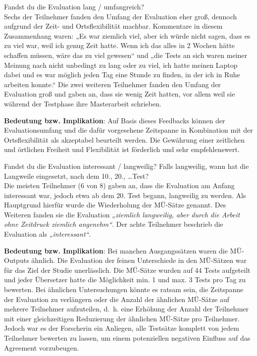 



\begin{description}[font = \normalfont]
\item [1.] Fandst du die Evaluation lang / umfangreich?\\
Sechs der Teilnehmer fanden den Umfang der Evaluation eher groß, dennoch aufgrund der Zeit- und Ortsflexibilität machbar. Kommentare in diesem Zusammenhang waren: „Es war ziemlich viel, aber ich würde nicht sagen, dass es zu viel war, weil ich genug Zeit hatte. Wenn ich das alles in 2 Wochen hätte schaffen müssen, wäre das zu viel gewesen“ und „die Tests an sich waren meiner Meinung nach nicht unbedingt zu lang oder zu viel, ich hatte meinen Laptop dabei und es war möglich jeden Tag eine Stunde zu finden, in der ich in Ruhe arbeiten konnte.“ Die zwei weiteren Teilnehmer fanden den Umfang der Evaluation groß und gaben an, dass sie wenig Zeit hatten, vor allem weil sie während der Testphase ihre Masterarbeit schrieben.

\textbf{Bedeutung bzw. Implikation}: Auf Basis dieses Feedbacks können der Evaluationsumfang und die dafür vorgesehene Zeitspanne in Kombination mit der Ortsflexibilität als akzeptabel beurteilt werden. Die Gewährung einer zeitlichen und örtlichen Freiheit und Flexibilität ist förderlich und sehr empfehlenswert.

\item[2.] Fandst du die Evaluation interessant / langweilig? Falls langweilig, wann hat die Langweile eingesetzt, nach dem 10., 20., \ldots Test?\\
Die meisten Teilnehmer (6 von 8) gaben an, dass die Evaluation am Anfang interessant war, jedoch etwa ab dem 20. Test begann, langweilig zu werden. Als Hauptgrund hierfür wurde die Wiederholung der MÜ-Sätze genannt. Des Weiteren fanden sie die Evaluation \textit{„ziemlich langweilig, aber durch die Arbeit ohne Zeitdruck ziemlich angenehm“}. Der achte Teilnehmer beschrieb die Evaluation als \textit{„interessant“}.

\textbf{Bedeutung bzw. Implikation}: Bei manchen Ausgangssätzen waren die MÜ-Outputs ähnlich. Die Evaluation der feinen Unterschiede in den MÜ-Sätzen war für das Ziel der Studie unerlässlich. Die MÜ-Sätze wurden auf 44 Tests aufgeteilt und jeder Übersetzer hatte die Möglichkeit min. 1 und max. 3 Tests pro Tag zu bewerten. Bei ähnlichen Untersuchungen könnte es ratsam sein, die Zeitspanne der Evaluation zu verlängern oder die Anzahl der ähnlichen MÜ-Sätze auf mehrere Teilnehmer aufzuteilen, d.~h. eine Erhöhung der Anzahl der Teilnehmer mit einer gleichzeitigen Reduzierung der ähnlichen MÜ-Sätze pro Teilnehmer. Jedoch war es der Forscherin ein Anliegen, alle Testsätze komplett von jedem Teilnehmer bewerten zu lassen, um einem potenziellen negativen Einfluss auf das Agreement vorzubeugen.


\end{description}
